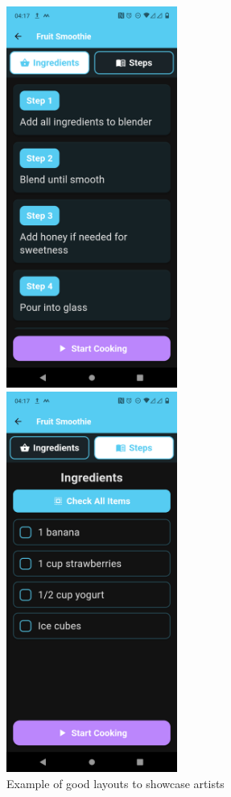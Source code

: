 \documentclass[]{project_final}
\begin{document}
\begin{figure}[ht!]
    \centering
    \begin{minipage}[t]{0.4\textwidth}
        \includegraphics[width=0.5\textwidth]{presteps.png}
    \end{minipage}
    \hfill
    \begin{minipage}[t]{0.4\textwidth}
        \includegraphics[width=0.5\textwidth]{preingredients.png}
    \end{minipage}
    \caption{Example of good layouts to showcase artists}
    \label{fig:1}
\end{figure}
\end{document}
